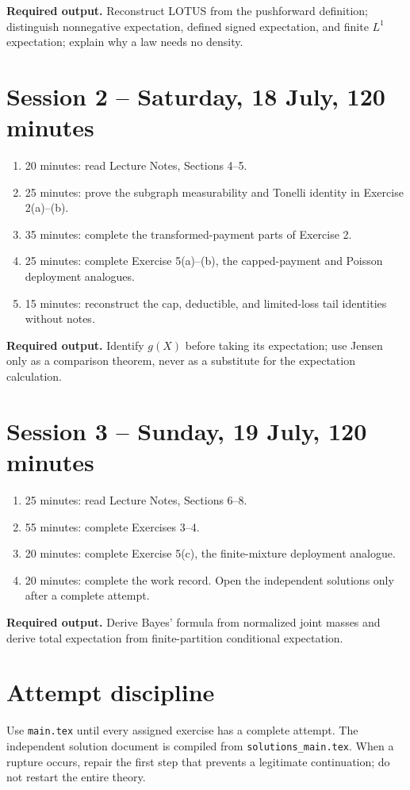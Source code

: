 \textbf{Required output.} Reconstruct LOTUS from the pushforward definition; distinguish nonnegative expectation, defined signed expectation, and finite $L^1$ expectation; explain why a law needs no density.

\section*{Session 2 -- Saturday, 18 July, 120 minutes}

\begin{enumerate}
  \item 20 minutes: read Lecture Notes, Sections 4--5.
  \item 25 minutes: prove the subgraph measurability and Tonelli identity in Exercise 2(a)--(b).
  \item 35 minutes: complete the transformed-payment parts of Exercise 2.
  \item 25 minutes: complete Exercise 5(a)--(b), the capped-payment and Poisson deployment analogues.
  \item 15 minutes: reconstruct the cap, deductible, and limited-loss tail identities without notes.
\end{enumerate}

\textbf{Required output.} Identify $g(X)$ before taking its expectation; use Jensen only as a comparison theorem, never as a substitute for the expectation calculation.

\section*{Session 3 -- Sunday, 19 July, 120 minutes}

\begin{enumerate}
  \item 25 minutes: read Lecture Notes, Sections 6--8.
  \item 55 minutes: complete Exercises 3--4.
  \item 20 minutes: complete Exercise 5(c), the finite-mixture deployment analogue.
  \item 20 minutes: complete the work record. Open the independent solutions only after a complete attempt.
\end{enumerate}

\textbf{Required output.} Derive Bayes' formula from normalized joint masses and derive total expectation from finite-partition conditional expectation.

\section*{Attempt discipline}

Use \texttt{main.tex} until every assigned exercise has a complete attempt. The independent solution document is compiled from \texttt{solutions\_main.tex}. When a rupture occurs, repair the first step that prevents a legitimate continuation; do not restart the entire theory.
